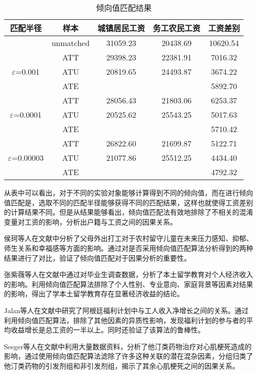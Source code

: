 \begin{table}[h]
  \centering
  \caption{倾向值匹配结果} 
  \label{匹配}
  \begin{tabular}{|c|c|c|c|c|}\hline
   匹配半径 & 样本 & 城镇居民工资 & 务工农民工资&工资差别 \\ \hline
 & unmatched & 31059.23 & 20438.69 & 10620.54 \\ \hline
  & ATT & 29398.23 &22381.91 & 7016.32\\ 
  $\varepsilon$=0.001& ATU & 20819.65 &24493.87 & 3674.22\\ 
  & ATE &  & & 5892.70\\ \hline
  & ATT & 28056.43 &21803.06 & 6253.37\\ 
  $\varepsilon$=0.0001& ATU & 20525.62 &25543.25 & 5017.63\\ 
  & ATE &  & & 5710.42\\ \hline
  & ATT & 26822.60 &21699.87 & 5122.71\\ 
  $\varepsilon$=0.00003&ATU & 21077.86&25512.25 & 4434.40\\ 
  & ATE &  & & 4792.32\\ \hline
  \end{tabular}
\end{table}

从表中可以看出，对于不同的实验对象能够计算得到不同的倾向值，而在进行倾向值匹配是，选取不同的匹配半径能够获得不同的匹配结果，这样也就使得工资差别的计算结果不同。但是从结果能够看出，倾向值匹配法有效地排除了不相关的混淆变量对工资的影响，分析出户籍与工资之间的因果关系。

侯珂等人在文献\cite{侯珂2014留守对农村儿童青少年社会适应的影响}中分析了父母外出打工对于农村留守儿童在未来压力感知、抑郁、师生关系和幸福感等方面的影响。通过对是否采用倾向值匹配算法分析得到的两种结果进行了对比，验证了倾向值匹配对于因果分析的重要性。

张紫薇等人在文献\cite{张紫薇2016大学本土留学教育个人收益的计量分析}中通过对毕业生调查数据，分析了本土留学教育对个人经济收入的影响。利用倾向值匹配算法排除了个人性别、专业意向、家庭背景等因素对结果的影响，得出了学本土留学教育存在显著经济收益的结论。

Jalan等人在文献\cite{jalan2003estimating}中研究了阿根廷福利计划中与工人收入净增长之间的关系。通过利用倾向值匹配算法，排除了其他因素的异质性影响，发现福利计划的参与者的平均收益增长是总工资的一半以上。同时还验证了该算法的鲁棒性。

Seeger等人在文献\cite{seeger2005application}中利用大量数据资料，分析了他汀类药物治疗对心肌梗死造成的影响，通过使用倾向值匹配算法滤除了许多这种关联的潜在混杂因素，分组归类了他汀类药物的引发剂组和非引发剂组，揭示了其余心肌梗死之间的因果关系。


